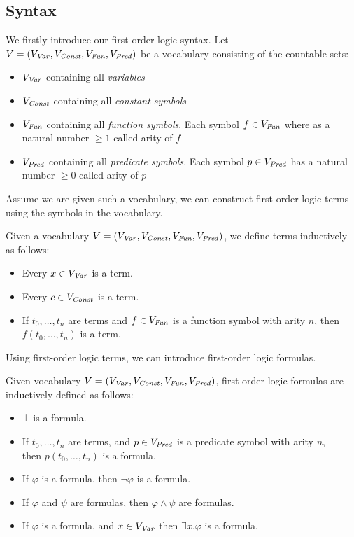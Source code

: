 \subsection{Syntax}
We firstly introduce our first-order logic syntax.
Let $V = (V_{\mathit{Var}}, V_{\mathit{Const}}, V_{\mathit{Fun}}, V_{\mathit{Pred}})$ be a vocabulary consisting of the countable sets:
\begin{itemize}
	\item $V_{\mathit{Var}}$ containing all \textsl{variables}
	\item $V_{\mathit{Const}}$ containing all \textsl{constant symbols}
	\item $V_{\mathit{Fun}} $ containing all \textsl{function symbols}. Each symbol $f \in V_{\mathit{Fun}}$ where as a natural number $\geq 1$ called arity of $f$
 	\item $V_{\mathit{Pred}}$ containing all \textsl{predicate symbols}. Each symbol $p \in V_{\mathit{Pred}}$ has a natural number $\geq 0$ called arity of $p$
\end{itemize}
Assume we are given such a vocabulary, we can construct first-order logic terms using the symbols in the vocabulary.
\begin{mydef}[Term] 
	Given a vocabulary $V = (V_{\mathit{Var}}, V_{\mathit{Const}}, V_{\mathit{Fun}}, V_{\mathit{Pred}})$, we define terms inductively as follows:
	\begin{itemize}
		\item Every $x \in V_{\mathit{Var}}$ is a term.
		\item Every $c \in V_{\mathit{Const}}$ is a term.
		\item If $t_0, \ldots, t_n$ are terms and $f \in V_{\mathit{Fun}}$ is a function symbol with arity $n$, then $f(t_0, \ldots, t_n)$ is a term.
	\end{itemize}
\end{mydef}
Using first-order logic terms, we can introduce first-order logic formulas.
\begin{mydef}[Formula]
	Given vocabulary $V = (V_{\mathit{Var}}, V_{\mathit{Const}}, V_{\mathit{Fun}}, V_{\mathit{Pred}})$, first-order logic formulas are inductively defined as follows:
	\begin{itemize}
		\item $\bot$ is a formula.
		\item If  $t_0, \ldots, t_n$ are terms, and $p \in V_{\mathit{Pred}}$ is a predicate symbol with arity $n$, \\ then $p(t_0, \ldots, t_n)$ is a formula.
		\item If $\varphi$ is a formula, then $\neg \varphi$ is a formula.
		\item If $\varphi$ and $\psi$ are formulas, then $\varphi \land \psi$ are formulas.
		\item If $\varphi$ is a formula, and $x \in V_{\mathit{Var}}$ then $\exists x. \varphi$ is a formula.
	\end{itemize}
\end{mydef}
